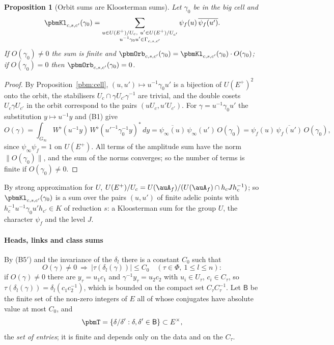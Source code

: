 \documentclass[10pt]{amsart}
\newtheorem{proposition}[theorem]{Proposition}
\theoremstyle{definition}
\theoremstyle{remark}
\providecommand{\auPl}{\Phi}
\providecommand{\aubar}[1]{\overline{#1}}
\begin{document}
\begin{proposition}[Orbit sums are Kloosterman sums]\label{pbm:orbit}
Let $\gamma_0$ be in the big cell and
\[
\pbmKl_{c,s,c'}(\gamma_0)=\sum_{\substack{u\in U(E^+)/U_c,\ u'\in U(E^+)/U_{c'}\\ u^{-1}\gamma_0u'\in\Gamma_{c,s,
c'}}}\psi_f(u)\,\aubar{\psi_f(u')} .
\]
If $O(\gamma_0)\ne0$ the sum is finite and $\pbmOrb_{c,s,c'}(\gamma_0)=\pbmKl_{c,s,c'}(\gamma_0)\cdot
O(\gamma_0)$; if $O(\gamma_0)=0$ then $\pbmOrb_{c,s,c'}(\gamma_0)=0$.
\end{proposition}
\begin{proof}
By Proposition~\ref{pbm:cell}, $(u,u')\mapsto u^{-1}\gamma_0u'$ is a bijection of $U(E^+)^2$ onto
the orbit, the stabilisers $U_c\cap\gamma U_{c'}\gamma^{-1}$ are trivial, and the double cosets
$U_c\gamma U_{c'}$ in the orbit correspond to the pairs $(uU_c,u'U_{c'})$. For $\gamma=u^{-1}\gamma_0
u'$ the substitution $y\mapsto u^{-1}y$ and (B1) give
\[
O(\gamma)=\int_{G_\infty}W^\flat(u^{-1}y)\,W^\flat(u'^{-1}\gamma_0^{-1}y)^*\,dy=\aubar{\psi_\infty(u)}\,\psi_\infty(
u')\,O(\gamma_0)=\psi_f(u)\,\aubar{\psi_f(u')}\,O(\gamma_0),
\]
since $\psi_\infty\psi_f=1$ on $U(E^+)$. All terms of the amplitude sum have the norm $\|O(\gamma_0)
\|$, and the sum of the norms converges; so the number of terms is finite if $O(\gamma_0)\ne0$.
\end{proof}

By strong approximation for $U$, $U(E^+)/U_c=U(\auA_f)/(U(\auA_f)\cap h_cJh_c^{-1})$; so
$\pbmKl_{c,s,c'}(\gamma_0)$ is a sum over the pairs $(u,u')$ of finite adelic points with $h_c^{-1}
u^{-1}\gamma_0u'h_{c'}\in K$ of reduction $s$: a Kloosterman sum for the group $U$, the character
$\psi_f$ and the level $J$.

\paragraph*{Heads, links and class sums}
By (B5$'$) and the invariance of the $\delta_l$ there is a constant $C_0$ such that
\begin{equation}\label{pbm:eq-bdd}
O(\gamma)\ne0\ \Longrightarrow\ |\tau(\delta_l(\gamma))|\le C_0\quad(\tau\in\auPl,\ 1\le l\le n):
\end{equation}
if $O(\gamma)\ne0$ there are $y_\tau=u_1c_1$ and $\gamma^{-1}y_\tau=u_2c_2$ with $u_i\in U_\tau$,
$c_i\in C_\tau$, so $\tau(\delta_l(\gamma))=\delta_l(c_1c_2^{-1})$, which is bounded on the compact
set $C_\tau C_\tau^{-1}$. Let $\mathsf B$ be the finite set of the non-zero integers of $E$ all of
whose conjugates have absolute value at most $C_0$, and
\[
\pbmT=\{\delta/\delta':\delta,\delta'\in\mathsf B\}\subset E^\times ,
\]
the \emph{set of entries}; it is finite and depends only on the data and on the $C_\tau$.
\end{document}
